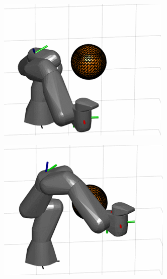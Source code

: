 \documentclass[../main.tex]{subfiles}
\begin{document}
\begin{figure}[H]
    \centering
    \begin{subfigure}[b]{0.24\textwidth}
        \centering
        \includegraphics[width=\textwidth]{figures/linkcollision/g0_1.png}
        \label{}
    \end{subfigure}
    \begin{subfigure}[b]{0.24\textwidth}
        \centering
         \includegraphics[width=\textwidth]{figures/linkcollision/g0_2.png}
        \label{}
    \end{subfigure}

\end{figure}
\end{document}

